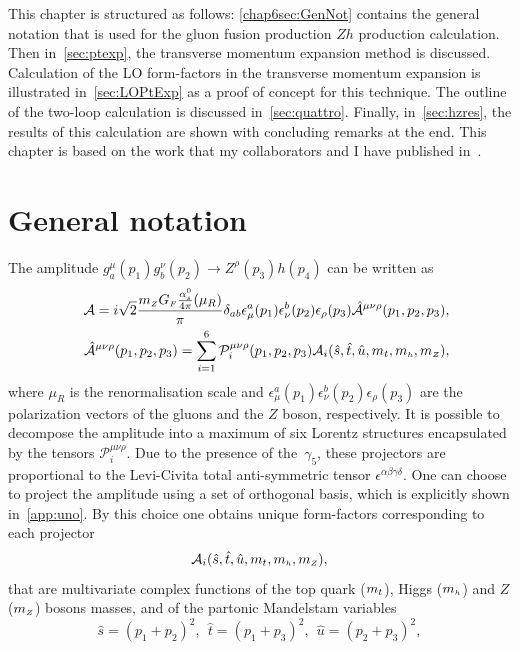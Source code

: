 This chapter is structured as follows: \autoref{chap6sec:GenNot} contains the general notation that is used for the gluon fusion production $Zh$ production calculation. Then in~\autoref{sec:ptexp}, the transverse momentum expansion method is discussed.  Calculation of the LO form-factors in the transverse momentum expansion is illustrated in~\autoref{sec:LOPtExp} as a proof of concept for this technique. The outline of the two-loop calculation is discussed in~\autoref{sec:quattro}. Finally, in~\autoref{sec:hzres}, the results of this calculation are shown with concluding remarks at the end.  This chapter is based on the work that my collaborators and I have published in~\cite{Alasfar:2021ppe}. 
\section{General notation \label{chap6sec:GenNot} }
\par The amplitude  $g^\mu_a(p_1)g^\nu_b(p_2)\to Z^\rho(p_3) h(p_4)$ can be written as
\begin{align}
	&&{\cal A}=i \sqrt{2}\frac{m_{ \scriptscriptstyle Z} G_{ \scriptscriptstyle F} \frac{\alpha_s^0}{4 \pi}(\mu_R)}{\pi}\delta_{ab}\epsilon^a_\mu(p_1)
	\epsilon^b_\nu(p_2)\epsilon_\rho(p_3)\hat{{\cal A}}^{\mu\nu\rho}(p_1,p_2,p_3 ),\\
	&&\hat{{\cal A}}^{\mu\nu\rho}(p_1,p_2,p_3 )=\sum_{i=1}^{6}
	\mathcal{P}_i^{\mu\nu\rho}(p_1,p_2,p_3 )
	{\cal A}_i(\hat{s},\hat{t},\hat{u},m_t,m_{ \scriptscriptstyle h},m_{ \scriptscriptstyle Z}),
	\label{eq:amp}
\end{align}
where  $\mu_R$ is the renormalisation scale and
$\epsilon^a_\mu(p_1)\epsilon^b_\nu(p_2)\epsilon_\rho(p_3)$ are the
polarization vectors of the gluons and the $Z$ boson, respectively.  It is possible to decompose the amplitude into a maximum of six Lorentz structures encapsulated by the 
tensors $\mathcal{P}_i^{\mu\nu\rho}$. Due to the presence of the~$\gamma_5$, these projectors are
proportional to the Levi-Civita total anti-symmetric tensor
$\epsilon^{\alpha\beta\gamma\delta}$. One can choose to project the amplitude using a set of orthogonal basis, which is explicitly shown in~\autoref{app:uno}. 
By this choice one obtains unique form-factors corresponding to each projector
\begin{equation}
	{\cal A}_i(\hat{s},\hat{t},\hat{u},m_t,m_{ \scriptscriptstyle h},m_{ \scriptscriptstyle Z}),
\end{equation}
that are multivariate complex functions of the
top quark ($m_t$), Higgs ($m_{ \scriptscriptstyle h}$) and $Z$ ($m_{ \scriptscriptstyle Z}$) bosons masses, and of the partonic Mandelstam variables
\begin{equation}
	\hat{s}=(p_1+p_2)^2,~~ \hat{t}=(p_1+p_3)^2,~~ \hat{u}=(p_2+p_3)^2,
\end{equation}
